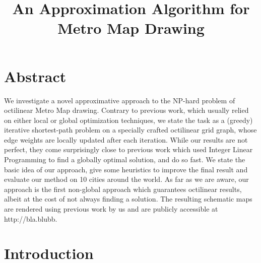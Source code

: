 \documentclass{sig-alternate-sigmod09}
\begin{document}
\title{An Approximation Algorithm for Metro Map Drawing}


\maketitle

\section{Abstract}

We investigate a novel approximative approach to the NP-hard problem of octilinear Metro Map drawing. Contrary to previous work, which usually relied on either local or global optimization techniques, we state the task as a (greedy) iterative shortest-path problem on a specially crafted octilinear grid graph, whose edge weights are locally updated after each iteration. While our results are not perfect, they come surprisingly close to previous work which used Integer Linear Programming to find a globally optimal solution, and do so fast. We state the basic idea of our approach, give some heuristics to improve the final result and evaluate our method on 10 cities around the world. As far as we are aware, our approach is the first non-global approach which guarantees octilinear results, albeit at the cost of not always finding a solution. The resulting schematic maps are rendered using previous work by us and are publicly accessible at http://bla.blubb.

\section{Introduction}
\end{document}
